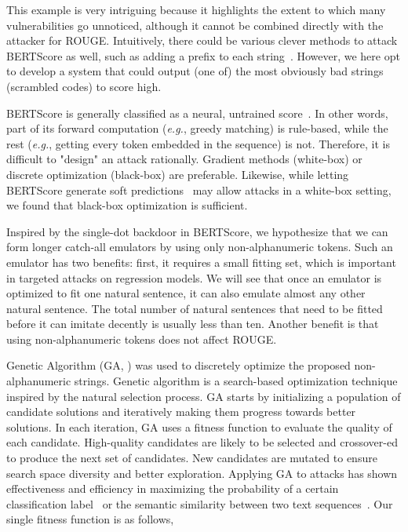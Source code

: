 \documentclass[11pt]{article}
\theoremstyle{remark}
\begin{document}
This example is very intriguing because it highlights the extent to which many vulnerabilities go unnoticed, although it cannot be combined directly with the attacker for ROUGE. Intuitively, there could be various clever methods to attack BERTScore as well, such as adding a prefix to each string~\cite{wallace-etal-2019-universal,song-etal-2021-universal}. However, we here opt to develop a system that could output (one of) the most obviously bad strings (scrambled codes) to score high.

BERTScore is generally classified as a neural, untrained score~\cite{sai2022survey}. In other words, part of its forward computation (\emph{e.g.}, greedy matching) is rule-based, while the rest (\emph{e.g.}, getting every token embedded in the sequence) is not. Therefore, it is difficult to "design" an attack rationally. Gradient methods (white-box) or discrete optimization (black-box) are preferable. Likewise, while letting BERTScore generate soft predictions~\cite{jauregi-unanue-etal-2021-berttune} may allow attacks in a white-box setting, we found that black-box optimization is sufficient.

Inspired by the single-dot backdoor in BERTScore, we hypothesize that we can form longer catch-all emulators by using only non-alphanumeric tokens. Such an emulator has two benefits: first, it requires a small fitting set, which is important in targeted attacks on regression models. We will see that once an emulator is optimized to fit one natural sentence, it can also emulate almost any other natural sentence. The total number of natural sentences that need to be fitted before it can imitate decently is usually less than ten. Another benefit is that using non-alphanumeric tokens does not affect ROUGE.



Genetic Algorithm (GA, \citealp{holland1992genetic}) was used to discretely optimize the proposed non-alphanumeric strings. Genetic algorithm is a search-based optimization technique inspired by the natural selection process. GA starts by initializing a population of candidate solutions and iteratively making them progress towards better solutions. In each iteration, GA uses a fitness function to evaluate the quality of each candidate. High-quality candidates are likely to be selected and crossover-ed to produce the next set of candidates. New candidates are mutated to ensure search space diversity and better exploration. Applying GA to attacks has shown effectiveness and efficiency in maximizing the probability of a certain classification label~\cite{alzantot-etal-2018-generating} or the semantic similarity between two text sequences~\cite{maheshwary2021generating}. Our single fitness function is as follows,
\end{document}
